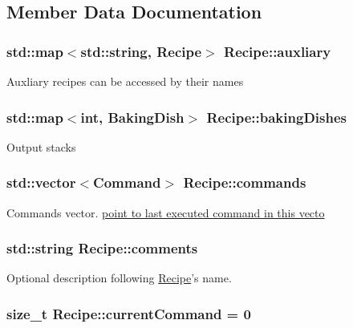 \subsection{Member Data Documentation}
\hypertarget{classRecipe_a6d8db46e663ea4792424742098e35e99}{
\subsubsection[{auxliary}]{\setlength{\rightskip}{0pt plus 5cm}std\-::map$<$std\-::string, {\bf Recipe}$>$ Recipe\-::auxliary\hspace{0.3cm}{\ttfamily [private]}}}\label{classRecipe_a6d8db46e663ea4792424742098e35e99}
Auxliary recipes can be accessed by their names \hypertarget{classRecipe_a0656141f4c08c927d7e5ca33f7250775}{
\subsubsection[{baking\-Dishes}]{\setlength{\rightskip}{0pt plus 5cm}std\-::map$<$int, {\bf Baking\-Dish}$>$ Recipe\-::baking\-Dishes\hspace{0.3cm}{\ttfamily [private]}}}\label{classRecipe_a0656141f4c08c927d7e5ca33f7250775}
Output stacks \hypertarget{classRecipe_a4064c07492776e65ff332027576174f1}{
\subsubsection[{commands}]{\setlength{\rightskip}{0pt plus 5cm}std\-::vector$<${\bf Command}$>$ Recipe\-::commands\hspace{0.3cm}{\ttfamily [private]}}}\label{classRecipe_a4064c07492776e65ff332027576174f1}
Commands vector. \hyperlink{}{point to last executed command in this vecto }\hypertarget{classRecipe_acb84c5456c600ac904b49ff56b13ed5e}{
\subsubsection[{comments}]{\setlength{\rightskip}{0pt plus 5cm}std\-::string Recipe\-::comments}}\label{classRecipe_acb84c5456c600ac904b49ff56b13ed5e}
Optional description following \hyperlink{classRecipe}{Recipe}'s name. \hypertarget{classRecipe_ab29f1a07d6c30a5c7b4da4ab53822c49}{
\subsubsection[{current\-Command}]{\setlength{\rightskip}{0pt plus 5cm}size\-\_\-t Recipe\-::current\-Command = 0\hspace{0.3cm}{\ttfamily [private]}}}\label{classRecipe_ab29f1a07d6c30a5c7b4da4ab53822c49}
